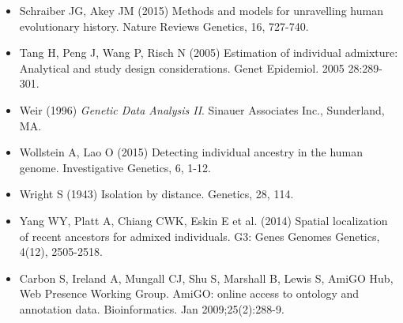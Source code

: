 \begin{itemize}
\item[] Schraiber JG, Akey JM (2015) Methods and models for unravelling human evolutionary history. Nature Reviews Genetics, 16, 727-740.

\item[] Tang H, Peng J, Wang P, Risch N (2005) Estimation of individual admixture: Analytical and study design considerations. Genet Epidemiol. 2005 28:289-301.

\item[] Weir (1996) {\it Genetic Data Analysis II}. Sinauer Associates Inc., Sunderland, MA.

\item[] Wollstein A, Lao O (2015) Detecting individual ancestry in the human genome. Investigative Genetics, 6, 1-12.

\item[] Wright S (1943) Isolation by distance. Genetics, 28, 114.

\item[] Yang WY, Platt A, Chiang CWK, Eskin E et al. (2014) Spatial localization of recent ancestors for admixed individuals. G3: Genes Genomes Genetics, 4(12), 2505-2518.

\item[] Carbon S, Ireland A, Mungall CJ, Shu S, Marshall B, Lewis S, AmiGO Hub, Web Presence Working Group. AmiGO: online access to ontology and annotation data. Bioinformatics. Jan 2009;25(2):288-9.

\end{itemize}
